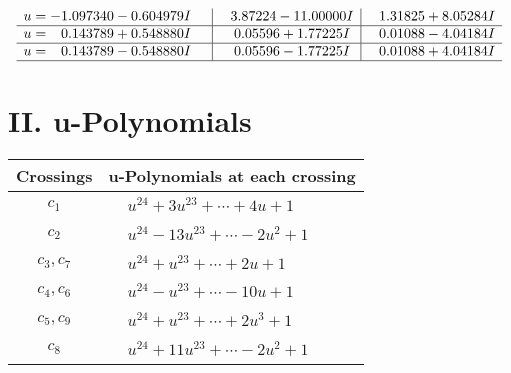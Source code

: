 \documentclass[1p]{elsarticle_modified}
\theoremstyle{definition}
\begin{document}
$$\begin{array}{c|c|c}
\begin{aligned}
u &= -1.097340 - 0.604979 I\end{aligned}
 & \phantom{-}3.87224 - 11.00000 I & \phantom{-}1.31825 + 8.05284 I \\ \hline\begin{aligned}
u &= \phantom{-}0.143789 + 0.548880 I\end{aligned}
 & \phantom{-}0.05596 + 1.77225 I & \phantom{-}0.01088 - 4.04184 I \\ \hline\begin{aligned}
u &= \phantom{-}0.143789 - 0.548880 I\end{aligned}
 & \phantom{-}0.05596 - 1.77225 I & \phantom{-}0.01088 + 4.04184 I\\
 \hline 
 \end{array}$$\newpage
\newpage\renewcommand{\arraystretch}{1}
\centering \section*{ II. u-Polynomials}
\begin{tabular}{m{50pt}|m{274pt}}
Crossings & \hspace{64pt}u-Polynomials at each crossing \\
\hline $$\begin{aligned}c_{1}\end{aligned}$$&$\begin{aligned}
&u^{24}+3 u^{23}+\cdots+4 u+1
\end{aligned}$\\
\hline $$\begin{aligned}c_{2}\end{aligned}$$&$\begin{aligned}
&u^{24}-13 u^{23}+\cdots-2 u^2+1
\end{aligned}$\\
\hline $$\begin{aligned}c_{3},c_{7}\end{aligned}$$&$\begin{aligned}
&u^{24}+u^{23}+\cdots+2 u+1
\end{aligned}$\\
\hline $$\begin{aligned}c_{4},c_{6}\end{aligned}$$&$\begin{aligned}
&u^{24}- u^{23}+\cdots-10 u+1
\end{aligned}$\\
\hline $$\begin{aligned}c_{5},c_{9}\end{aligned}$$&$\begin{aligned}
&u^{24}+u^{23}+\cdots+2 u^3+1
\end{aligned}$\\
\hline $$\begin{aligned}c_{8}\end{aligned}$$&$\begin{aligned}
&u^{24}+11 u^{23}+\cdots-2 u^2+1
\end{aligned}$\\
\hline
\end{tabular}\newpage\renewcommand{\arraystretch}{1}
\end{document}
